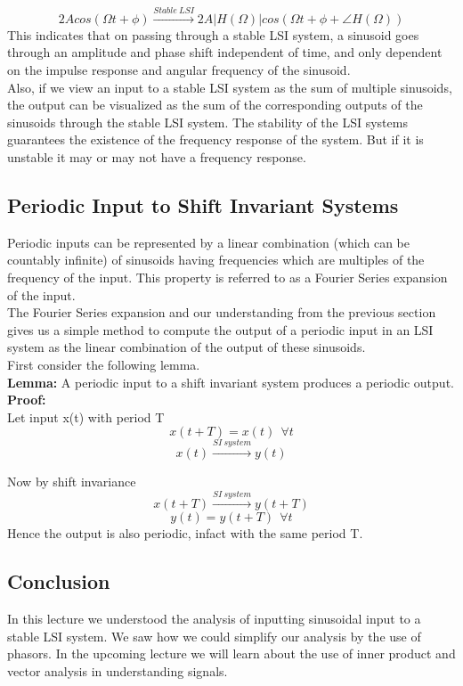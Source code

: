 \[
2Acos(\Omega t + \phi) \xrightarrow{Stable\ LSI} 2A|H(\Omega)|cos(\Omega t + \phi + \angle H(\Omega))
\]
This indicates that on passing through a stable LSI system, a sinusoid goes through an amplitude and phase shift independent of time, and only dependent on the impulse response and angular frequency of the sinusoid.\\
Also, if we view an input to a stable LSI system as the sum of multiple sinusoids, the output can be visualized as the sum of the corresponding outputs of the sinusoids through the stable LSI system. The stability of the LSI systems guarantees the existence of the frequency response of the system. But if it is unstable it may or may not have a frequency response.


\subsection{Periodic Input to Shift Invariant Systems}
Periodic inputs can be represented by a linear combination (which can be countably infinite) of sinusoids having frequencies which are multiples of the frequency of the input. This property is referred to as a Fourier Series expansion of the input. \\
The Fourier Series expansion and our understanding from the previous section gives us a simple method to compute the output of a periodic input in an LSI system as the linear combination of the output of these sinusoids.\\
First consider the following lemma.\\
\textbf{Lemma:} A periodic input to a shift invariant system produces a periodic output.\\
\textbf{Proof:}\\

Let input x(t) with period T
\[x(t+T) = x(t)\ \ \forall t\]
\[x(t) \xrightarrow{SI\ system} y(t) \]

Now by shift invariance
\[x(t+T) \xrightarrow{SI\ system} y(t+T) \]
\[y(t) = y(t+T)\ \ \forall t \]
Hence the output is also periodic, infact with the same period T.


\subsection{Conclusion}
In this lecture we understood the analysis of inputting sinusoidal input to a stable LSI system. We saw how we could simplify our analysis by the use of phasors. In the upcoming lecture we will learn about the use of inner product and vector analysis in understanding signals.

